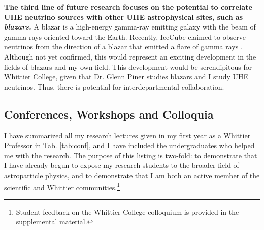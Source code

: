 \documentclass[../../main.tex]{subfiles}
\begin{document}
\textbf{The third line of future research focuses on the potential to correlate UHE neutrino sources with other UHE astrophysical sites, such as \textit{blazars.}}  A blazar is a high-energy gamma-ray emitting galaxy with the beam of gamma-rays oriented toward the Earth.  Recently, IceCube claimed to observe neutrinos from the direction of a blazar that emitted a flare of gamma rays \cite{eaat2890}.  Although not yet confirmed, this would represent an exciting development in the fields of blazars and my own field.  This development would be serendipitous for Whittier College, given that Dr. Glenn Piner studies blazars \cite{piner2018multiepoch} and I study UHE neutrinos. Thus, there is potential for interdepartmental collaboration. \\ \hspace{0.1cm}

\subsection{Conferences, Workshops and Colloquia}

I have summarized all my research lectures given in my first year as a Whittier Professor in Tab. \ref{tab:conf}, and I have included the undergraduates who helped me with the research.  The purpose of this listing is two-fold: to demonstrate that I have already begun to expose my research students to the broader field of astroparticle physics, and to demonstrate that I am both an active member of the scientific and Whittier communities.\footnote{Student feedback on the Whittier College colloquium is provided in the supplemental material.}
\end{document}
